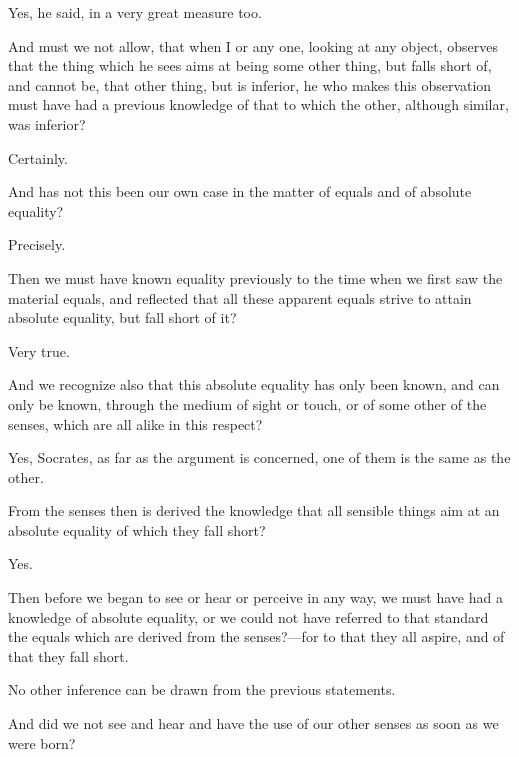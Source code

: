 \documentclass[11pt,letter]{article}
\begin{document}
\par  Yes, he said, in a very great measure too.

\par  And must we not allow, that when I or any one, looking at any object, observes that the thing which he sees aims at being some other thing, but falls short of, and cannot be, that other thing, but is inferior, he who makes this observation must have had a previous knowledge of that to which the other, although similar, was inferior?

\par  Certainly.

\par  And has not this been our own case in the matter of equals and of absolute equality?

\par  Precisely.

\par  Then we must have known equality previously to the time when we first saw the material equals, and reflected that all these apparent equals strive to attain absolute equality, but fall short of it?

\par  Very true.

\par  And we recognize also that this absolute equality has only been known, and can only be known, through the medium of sight or touch, or of some other of the senses, which are all alike in this respect?

\par  Yes, Socrates, as far as the argument is concerned, one of them is the same as the other.

\par  From the senses then is derived the knowledge that all sensible things aim at an absolute equality of which they fall short?

\par  Yes.

\par  Then before we began to see or hear or perceive in any way, we must have had a knowledge of absolute equality, or we could not have referred to that standard the equals which are derived from the senses?—for to that they all aspire, and of that they fall short.

\par  No other inference can be drawn from the previous statements.

\par  And did we not see and hear and have the use of our other senses as soon as we were born?
\end{document}
